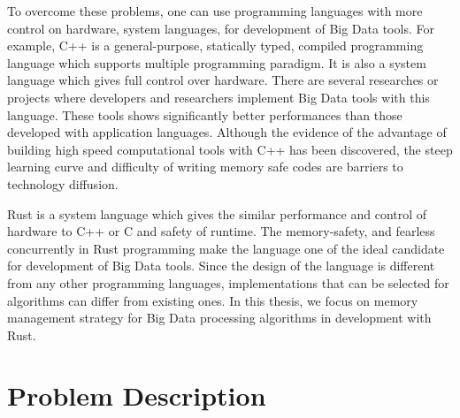 To overcome these problems, one can use programming languages with more control on hardware, system languages, for development of Big Data tools. For example, C++ is a general-purpose, statically typed, 
compiled programming language which supports multiple programming paradigm. It is also a system language which gives full control over hardware. 
There are several researches or projects \cite{DBLP:conf/sigmod/0001BLLMSTYJ18} where developers and 
researchers implement Big Data tools with this language. These tools shows significantly better performances than those developed with application languages. 
Although the evidence of the advantage of building high speed computational tools with C++ has been discovered, the steep learning curve and difficulty of writing memory safe codes are barriers to technology diffusion.

Rust is a system language which gives the similar performance and control of hardware to C++ or C and safety of runtime. The memory-safety, and fearless concurrently in Rust programming 
make the language one of the ideal candidate for development of Big Data tools. 
Since the design of the language is different from any other programming languages, implementations that can be selected for algorithms can differ from existing ones.
In this thesis, we focus on memory management strategy for Big Data processing algorithms in development with Rust. 


\section{Problem Description}
\label{sec:probdesc}



